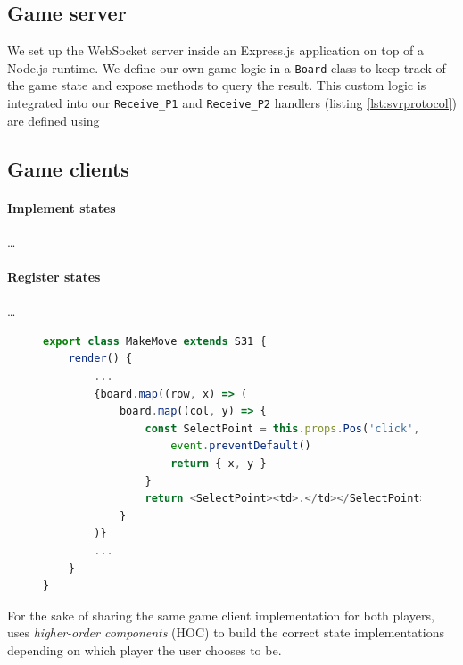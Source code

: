 \documentclass[submission,copyright,creativecommons]{eptcs}
\begin{document}
\subsection{Game server}
\label{section:exampleserver}

We set up the WebSocket server inside an Express.js \cite{ExpressJS} application on top of a Node.js \cite{NodeJS} runtime. We define our own game logic in a \texttt{Board} class to keep track of the game state and expose methods to query the result. This custom logic is integrated into our 
\texttt{Receive\_P1} and \texttt{Receive\_P2} handlers (listing \ref{lst:svrprotocol}) are defined using 





\subsection{Game clients}

\paragraph{Implement states} \dots

\paragraph{Register states} \dots

\begin{figure}[!h]
\begin{lstlisting}[language=JavaScript, tabsize=4]
export class MakeMove extends S31 {
	render() {
		...
		{board.map((row, x) => (
			board.map((col, y) => {
				const SelectPoint = this.props.Pos('click', event => {
					event.preventDefault()
					return { x, y }
				}
				return <SelectPoint><td>.</td></SelectPoint>
			}
		)}
		...
	}
}
\end{lstlisting}  
\label{lst:clientapp}
\end{figure}

For the sake of sharing the same game client implementation for both players, \cite{NoughtsAndCrosses} uses \textit{higher-order components} (HOC) to build the correct state implementations depending on which player the user chooses to be. 
\end{document}
